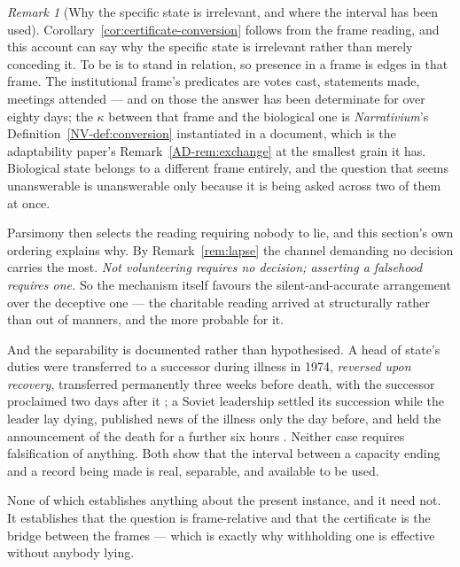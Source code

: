 \documentclass[11pt,a4paper]{article}
\theoremstyle{remark}
\newtheorem{remark}[definition]{Remark}
\begin{document}
\begin{remark}[Why the specific state is irrelevant, and where the interval has been used]\label{rem:certificate}
Corollary~\ref{cor:certificate-conversion} follows from the frame reading, and this account can say why
the specific state is irrelevant rather than merely conceding it. To be is to stand in relation, so
presence in a frame is edges in that frame. The institutional frame's predicates are votes cast,
statements made, meetings attended --- and on those the answer has been determinate for over eighty
days; the $\kappa$ between that frame and the biological one is \emph{Narrativium}'s
Definition~\ref{NV-def:conversion} instantiated in a document, which is the adaptability paper's
Remark~\ref{AD-rem:exchange} at the smallest grain it has. Biological state belongs to a different frame entirely, and
the question that seems unanswerable is unanswerable only because it is being asked across two of them
at once.

Parsimony then selects the reading requiring nobody to lie, and this section's own ordering
explains why. By Remark~\ref{rem:lapse} the channel demanding no decision carries the most. \emph{Not
volunteering requires no decision; asserting a falsehood requires one.} So the mechanism itself favours
the silent-and-accurate arrangement over the deceptive one --- the charitable reading arrived at
structurally rather than out of manners, and the more probable for it.

And the separability is documented rather than hypothesised. A head of state's duties were
transferred to a successor during illness in 1974, \emph{reversed upon recovery}, transferred
permanently three weeks before death, with the successor proclaimed two days after it
\citep{preston1993}; a Soviet leadership settled its succession while the leader lay dying, published
news of the illness only the day before, and held the announcement of the death for a further six hours
\citep{deathtiming,service2004}. Neither case requires falsification of anything. Both show that the interval
between a capacity ending and a record being made is real, separable, and available to be used.

None of which establishes anything about the present instance, and it need not. It establishes
that the question is frame-relative and that the certificate is the bridge between the frames ---
which is exactly why withholding one is effective without anybody lying.
\end{remark}
\end{document}
